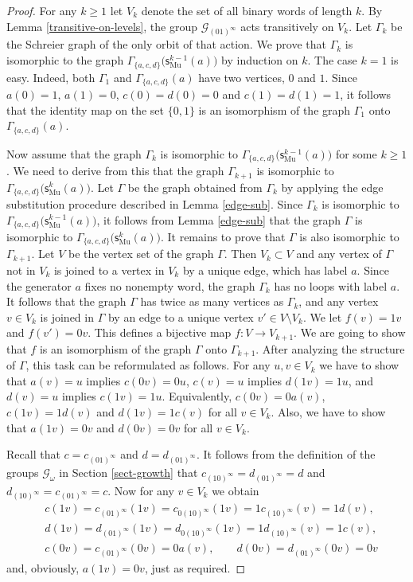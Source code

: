 \documentclass[12pt]{article}
\theoremstyle{definition}
\def\cG{\mathcal{G}}
\def\om{\omega}
\def\subst{\mathsf{s}}
\def\sub{\subst_{\mathrm{Mu}}}
\begin{document}
\begin{proof}
For any $k\ge1$ let $V_k$ denote the set of all binary words of length 
$k$.  By Lemma \ref{transitive-on-levels}, the group $\cG_{(01)^\infty}$ 
acts 
transitively on $V_k$.  Let $\Gamma_k$ be the Schreier graph of the only 
orbit of that action.  We prove that $\Gamma_k$ is isomorphic to the graph 
$\Gamma_{\{a,c,d\}}\bigl(\sub^{k-1}(a)\bigr)$ by induction on $k$.  The 
case $k=1$ is easy.  Indeed, both $\Gamma_1$ and $\Gamma_{\{a,c,d\}}(a)$ 
have two vertices, $0$ and $1$.  Since $a(0)=1$, $a(1)=0$, $c(0)=d(0)=0$ 
and $c(1)=d(1)=1$, it follows that the identity map on the set $\{0,1\}$ is 
an isomorphism of the graph $\Gamma_1$ onto $\Gamma_{\{a,c,d\}}(a)$.

Now assume that the graph $\Gamma_k$ is isomorphic to
$\Gamma_{\{a,c,d\}}\bigl(\sub^{k-1}(a)\bigr)$ for some $k\ge1$.  We need to 
derive from this that the graph $\Gamma_{k+1}$ is isomorphic to
$\Gamma_{\{a,c,d\}}\bigl(\sub^k(a)\bigr)$.  Let $\Gamma$ be the graph 
obtained from $\Gamma_k$ by applying the edge substitution procedure 
described in Lemma \ref{edge-sub}.  Since $\Gamma_k$ is isomorphic to
$\Gamma_{\{a,c,d\}}\bigl(\sub^{k-1}(a)\bigr)$, it follows from Lemma 
\ref{edge-sub} that the graph $\Gamma$ is isomorphic to 
$\Gamma_{\{a,c,d\}}\bigl(\sub^k(a)\bigr)$.  It remains to prove that 
$\Gamma$ is also isomorphic to $\Gamma_{k+1}$.  Let $V$ be the vertex set 
of the graph $\Gamma$.  Then $V_k\subset V$ and any vertex of $\Gamma$ not 
in $V_k$ is joined to a vertex in $V_k$ by a unique edge, which has label 
$a$.  Since the generator $a$ fixes no nonempty word, the graph $\Gamma_k$ 
has no loops with label $a$.  It follows that the graph $\Gamma$ has twice 
as many vertices as $\Gamma_k$, and any vertex $v\in V_k$ is joined in 
$\Gamma$ by an edge to a unique vertex $v'\in V\setminus V_k$.  We let 
$f(v)=1v$ and $f(v')=0v$.  This defines a bijective map $f:V\to V_{k+1}$.  
We are going to show that $f$ is an isomorphism of the graph $\Gamma$ onto 
$\Gamma_{k+1}$.  After analyzing the structure of $\Gamma$, this task can 
be reformulated as follows.  For any $u,v\in V_k$ we have to show that 
$a(v)=u$ implies $c(0v)=0u$, $c(v)=u$ implies $d(1v)=1u$, and $d(v)=u$ 
implies $c(1v)=1u$.  Equivalently, $c(0v)=0a(v)$, $c(1v)=1d(v)$ and  
$d(1v)=1c(v)$ for all $v\in V_k$.  Also, we have to show that $a(1v)=0v$ 
and $d(0v)=0v$ for all $v\in V_k$.

Recall that $c=c_{(01)^\infty}$ and $d=d_{(01)^\infty}$.  It follows from 
the definition of the groups $\cG_\om$ in Section \ref{sect-growth} that 
$c_{(10)^\infty}=d_{(01)^\infty}=d$ and $d_{(10)^\infty}=c_{(01)^\infty} 
=c$.  Now for any $v\in V_k$ we obtain
\begin{eqnarray*}
& c(1v)=c_{(01)^\infty}(1v)=c_{0(10)^\infty}(1v)
=1c_{(10)^\infty}(v)=1d(v),\\
& d(1v)=d_{(01)^\infty}(1v)=d_{0(10)^\infty}(1v)
=1d_{(10)^\infty}(v)=1c(v),\\
& c(0v)=c_{(01)^\infty}(0v)=0a(v),\qquad
d(0v)=d_{(01)^\infty}(0v)=0v
\end{eqnarray*}
and, obviously, $a(1v)=0v$, just as required.
\end{proof}
\end{document}
